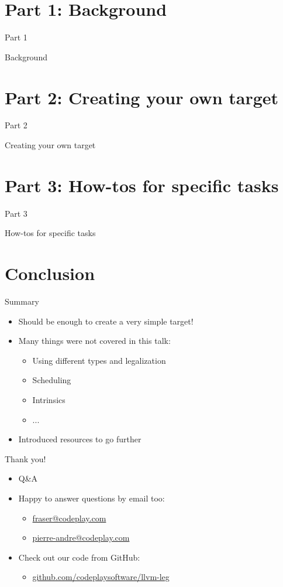 \documentclass[t]{beamer}
\newcommand{\talkpart}[2]{%
\section{Part #1: #2}

\begin{frame}[c]{Part #1}

\vspace{1cm}
\centerline{\LARGE{#2}}

\end{frame}}
\begin{document}

\talkpart{1}{Background}


\talkpart{2}{Creating your own target}


\talkpart{3}{How-tos for specific tasks}



\section*{Conclusion}

\begin{frame}{Summary}

\begin{itemize}
    \item Should be enough to create a very simple target!
    \item Many things were not covered in this talk:
    \begin{itemize}
        \item Using different types and legalization
        \item Scheduling
        \item Intrinsics
        \item ...
    \end{itemize}
    \item Introduced resources to go further
\end{itemize}

\end{frame}


\begin{frame}{Thank you!}

\begin{itemize}
    \item Q\&A
    \item Happy to answer questions by email too:
    \begin{itemize}
        \item \url{fraser@codeplay.com}
        \item \url{pierre-andre@codeplay.com}
    \end{itemize}
    \item Check out our code from GitHub:
    \begin{itemize}
        \item \url{github.com/codeplaysoftware/llvm-leg}
    \end{itemize}
\end{itemize}

\end{frame}

\end{document}
